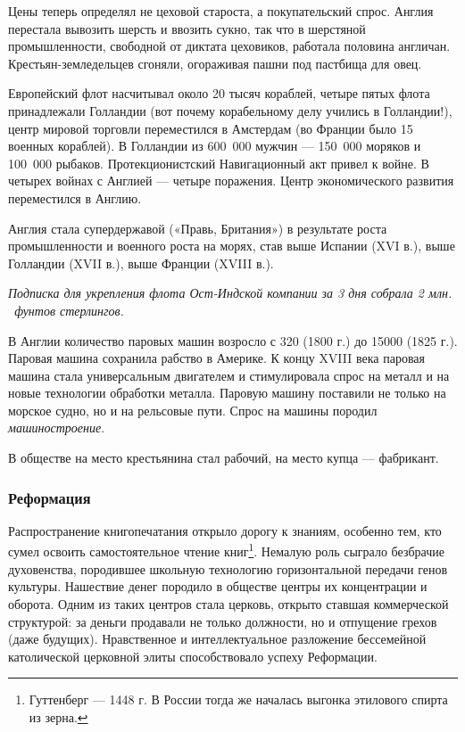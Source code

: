 Цены теперь определял не цеховой староста, а покупательский спрос. Англия перестала вывозить шерсть и ввозить сукно, так
что в шерстяной промышленности, свободной от диктата цеховиков, работала половина англичан. Крестьян-земледельцев
сгоняли, огораживая пашни под пастбища для овец.


Европейский флот насчитывал около 20 тысяч кораблей, четыре пятых флота принадлежали Голландии (вот почему корабельному
делу учились в Голландии!), центр мировой торговли переместился в Амстердам (во Франции было 15 военных кораблей). В
Голландии из 600~000 мужчин — 150~000 моряков и 100~000 рыбаков. Протекционистский Навигационный акт привел к войне. В
четырех войнах с Англией — четыре поражения. Центр экономического развития переместился в Англию.


Англия стала супердержавой («Правь, Британия») в результате роста промышленности и военного роста на морях, став выше
Испании (\foreignlanguage{english}{XVI} в.), выше Голландии (\foreignlanguage{english}{XVII} в.), выше Франции
(\foreignlanguage{english}{XVIII} в.).

{\itshape
\foreignlanguage{russian}{Подписка для укрепления флота Ост-Индской компании за 3 дня собрала 2 млн. \ фунтов
стерлингов.}}


В Англии количество паровых машин возросло с 320 (1800 г.) до 15000 (1825 г.). Паровая машина сохранила рабство в
Америке. К концу \foreignlanguage{english}{XVIII} века паровая машина стала универсальным двигателем и стимулировала
спрос на металл и на новые технологии обработки металла. Паровую машину поставили не только на морское судно, но и на
рельсовые пути. Спрос на машины породил \textit{машиностроение}.


В обществе на место крестьянина стал рабочий, на место купца — фабрикант.

\subsubsection[Реформация ]{Реформация }

Распространение книгопечатания открыло дорогу к знаниям, особенно тем, кто сумел освоить самостоятельное чтение
книг\footnote{Гуттенберг — 1448 г. В России тогда же началась выгонка этилового спирта из зерна.}.
Немалую роль сыграло безбрачие духовенства, породившее школьную технологию горизонтальной передачи генов культуры.
Нашествие денег породило в обществе центры их концентрации и оборота. Одним из таких центров стала церковь, открыто
ставшая коммерческой структурой: за деньги продавали не только должности, но и отпущение грехов (даже будущих).
Нравственное и интеллектуальное разложение бессемейной католической церковной элиты способствовало успеху Реформации.


